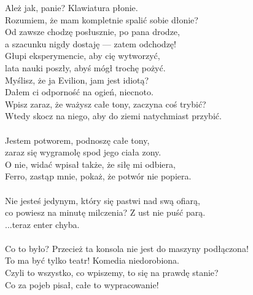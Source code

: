 \charprzy{}
Ależ jak, panie? Klawiatura płonie.\\
Rozumiem, że mam kompletnie spalić sobie dłonie?\\
Od zawsze chodzę posłusznie, po pana drodze,\\
a szacunku nigdy dostaję --- zatem odchodzę!\\

\chardok{}
Głupi eksperymencie, aby cię wytworzyć,\\
lata nauki poszły, abyś mógł trochę pożyć.\\
Myślisz, że ja Evilion, jam jest idiotą?\\
Dałem ci odporność na ogień, niecnoto.\\
Wpisz zaraz, że ważysz całe tony, zaczyna coś trybić?\\
Wtedy skocz na niego, aby do ziemi natychmiast przybić.\\

\\

\charmik{}
Jestem potworem, podnoszę całe tony,\\
zaraz się wygramolę spod jego ciała zony.\\
O nie, widać wpisał także, że siłę mi odbiera,\\
Ferro, zastąp mnie, pokaż, że potwór nie popiera.\\

\\

\charfer{}
Nie jesteś jedynym, który się pastwi nad swą ofiarą,\\
co powiesz na minutę milczenia? Z ust nie puść parą.\\
 ...teraz enter chyba.\\

\\

\charfer{}
Co to było? Przecież ta konsola nie jest do maszyny podłączona!\\
To ma być tylko teatr! Komedia niedorobiona.\\
Czyli to wszystko, co wpiszemy, to się na prawdę stanie?\\
Co za pojeb pisał, całe to wypracowanie!\\

